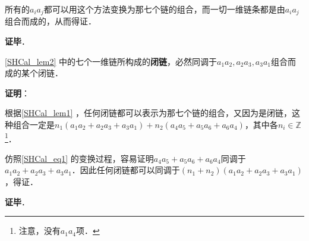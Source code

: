 所有的$a_ia_j$都可以用这个方法变换为那七个链的组合，而一切一维链条都是由$a_ia_j$组合而成的，从而得证．

\textbf{证毕}．

\begin{lemma}{}
\autoref{SHCal_lem2} 中的七个一维链所构成的\textbf{闭链}，必然同调于$a_1a_2, a_2a_3, a_3a_1$组合而成的某个闭链．
\end{lemma}

\textbf{证明}：


根据\autoref{SHCal_lem1} ，任何闭链都可以表示为那七个链的组合，又因为是闭链，这种组合一定是$n_1(a_1a_2+a_2a_3+a_3a_1)+n_2(a_4a_5+a_5a_6+a_6a_4)$，其中各$n_i\in\mathbb{Z}$\footnote{注意，没有$a_1a_4$项．}．

仿照\autoref{SHCal_eq1} 的变换过程，容易证明$a_4a_5+a_5a_6+a_6a_4$同调于$a_1a_2+a_2a_3+a_3a_1$．因此任何闭链都可以同调于$(n_1+n_2)(a_1a_2+a_2a_3+a_3a_1)$，得证．


\textbf{证毕}．










